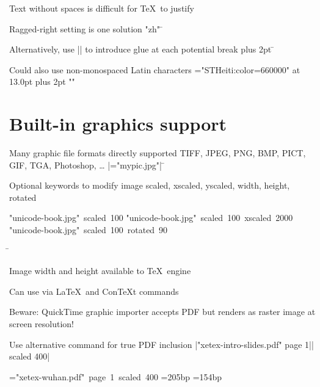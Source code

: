 \item Text without spaces is difficult for \TeX\ to justify
\item Ragged-right setting is one solution
\XeTeXlinebreaklocale "zh"
\=
\item Alternatively, use |\XeTeXlinebreakskip| to introduce glue at each potential break
\XeTeXlinebreakskip 0pt plus 2pt
\=
\item Could also use non-monospaced Latin characters
\font\simpchin="STHeiti:color=660000" at 13.0pt
\XeTeXlinebreakskip 0pt plus 2pt
\XeTeXlinebreaklocale ""

\section{Built-in graphics support}

\item Many graphic file formats directly supported
\subitem TIFF, JPEG, PNG, BMP, PICT, GIF, TGA, Photoshop, …
\subitem |=\hbox{\XeTeXpicfile "mypic.jpg"}|
\=
\item Optional keywords to modify image
\subitem scaled, xscaled, yscaled, width, height, rotated
\smallskip
\centerline{\hbox{\XeTeXpicfile "unicode-book.jpg" scaled 100}\qquad
 \hbox{\XeTeXpicfile "unicode-book.jpg" scaled 100 xscaled 2000}\qquad
 \hbox{\XeTeXpicfile "unicode-book.jpg" scaled 100 rotated 90}}
\=
\item Image width and height available to \TeX\ engine
\item Can use via \LaTeX\ and Con\TeX t commands

\item Beware: QuickTime graphic importer accepts PDF
\subitem but renders as raster image at screen resolution!
\item Use alternative command for true PDF inclusion
\subitem |\XeTeXpdffile "xetex-intro-slides.pdf" page 1|\hfil\break| scaled 400|
\smallskip
\centerline{=\vbox{\hbox{\XeTeXpdffile "xetex-wuhan.pdf" page 1 scaled 400}}%
  =205bp =154bp }

